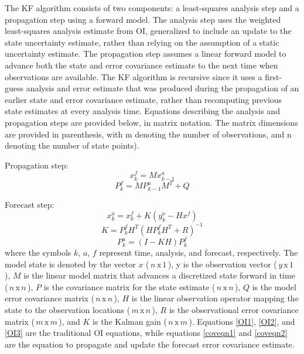 The KF algorithm consists of two components: a least-squares analysis step and a propagation step using a forward model. The analysis step uses the weighted least-squares analysis estimate from OI, generalized to include an update to the state uncertainty estimate, rather than relying on the assumption of a static uncertainty estimate. The propagation step assumes a linear forward model to advance both the state and error covariance estimate to the next time when observations are available. The KF algorithm is recursive since it uses a first-guess analysis and error estimate that was produced during the propagation of an earlier state and error covariance estimate, rather than recomputing previous state estimates at every analysis time. Equations describing the analysis and propagation steps are provided below, in matrix notation. The matrix dimensions are provided in parenthesis, with m denoting the number of observations, and n denoting the number of state points).

\noindent Propagation step:
\begin{equation}
   x_k^f = Mx_{k-1}^a
\label{OI1}
\end{equation}
\begin{equation}
\label{coveqn1}
   P_k^f = MP_{k-1}^{a}M^T + Q
\end{equation}

\noindent Forecast step:
\begin{equation}
\label{OI2}
   x_k^a = x_k^f + K(y_k^o - Hx^f)
\end{equation}
\begin{equation}
\label{OI3}
   K = P_k^fH^T(HP_k^fH^T + R)^{-1}
\end{equation}
\begin{equation}
\label{coveqn2}
   P_k^a = (I-KH)P_k^f
\end{equation}
\noindent where the symbols \( k \), \( a \), \( f \) represent time, analysis, and forecast, respectively. The model state is denoted by the vector \( x \) (\(\,n\,\mathrm{x}\,1\,\)), y is the observation vector (\(\,y\,\mathrm{x}\,1\,\)), \( M \) is the linear model matrix that advances a discretized state forward in time (\(\,n\,\mathrm{x}\,n\,\)), \( P \) is the covariance matrix for the state estimate (\(\,n\,\mathrm{x}\,n\,\)), \( Q \) is the model error covariance matrix (\(\,n\,\mathrm{x}\,n\,\)), \( H \) is the linear observation operator mapping the state to the observation locations (\(\,m\,\mathrm{x}\,n\,\)), \( R \) is the observational error covariance matrix (\(\,m\,\mathrm{x}\,m\,\)), and \( K \) is the Kalman gain (\(\,n\,\mathrm{x}\,m\,\)). Equations \ref{OI1}, \ref{OI2}, and \ref{OI3}  are the traditional OI equations, while equations \ref{coveqn1} and \ref{coveqn2} are the equation to propagate and update the forecast error covariance estimate.


